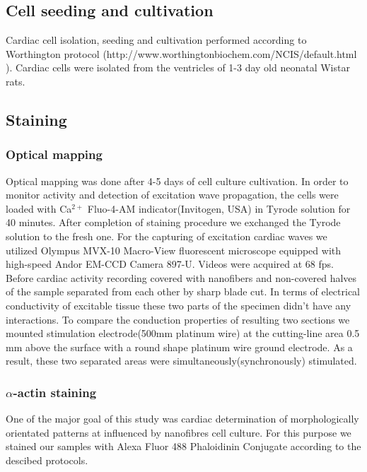 \subsection{Cell seeding and cultivation}
Cardiac cell isolation, seeding and cultivation performed according to Worthington protocol (http://www.worthingtonbiochem.com/NCIS/default.html ). Cardiac cells were isolated from the ventricles of 1-3 day old neonatal Wistar rats. 
\subsection{Staining}
\subsubsection{Optical mapping}
Optical mapping was done after 4-5 days of cell culture cultivation. In order to monitor activity and detection of excitation wave propagation, the cells were loaded with Ca$^{2+}$ Fluo-4-AM indicator(Invitogen, USA) in Tyrode solution for 40 minutes. After completion of staining procedure we exchanged the Tyrode solution to the fresh one. For the capturing of excitation cardiac waves we utilized Olympus MVX-10 Macro-View fluorescent microscope equipped with high-speed Andor EM-CCD Camera 897-U. Videos were acquired at 68 fps. Before cardiac activity recording covered with nanofibers and non-covered halves of the sample separated from each other by sharp blade cut. In terms of electrical conductivity of excitable tissue these two parts of the specimen didn't have any interactions. To compare the conduction properties of resulting two sections we mounted stimulation electrode(500mm platinum wire) at the cutting-line area 0.5 mm above the surface with a round shape platinum wire ground electrode. As a result, these two separated areas were simultaneously(synchronously) stimulated.
\subsubsection{$\alpha$-actin staining}
One of the major goal of this study was cardiac determination of morphologically orientated patterns at influenced by nanofibres cell culture. For this purpose we stained our samples with Alexa Fluor 488 Phaloidinin Conjugate according to the descibed protocols\cite{Orlova2011}.   